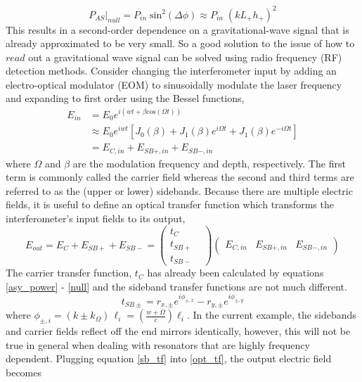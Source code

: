 			\begin{equation}\label{null}
			P_{AS} \vert_{null} = P_{in} \; \text{sin}^2 (\Delta \phi) \approx P_{in} \; (k L_{+} h_{+})^2 
			\end{equation}
		This results in a second-order dependence on a gravitational-wave signal that is already approximated to be very small.  
		So a good solution to the issue of how to $read$ out a gravitational wave signal can be solved using radio frequency (RF) detection methods. Consider changing the interferometer input by adding an electro-optical modulator (EOM) to sinusoidally modulate the laser frequency and expanding to first order using the Bessel functions,
			\begin{equation}\label{modE}
			\begin{aligned}
			E_{in} 	&= E_{0} e^{i(wt + \beta \text{cos} (\Omega t))} \\
					&\approx E_0 e^{iwt} [J_0(\beta) + J_1(\beta) e^{i \Omega t} + J_1(\beta) e^{-i \Omega t}] \\
					&= E_{C,in} + E_{SB+,in} + E_{SB-,in}
			\end{aligned}
			\end{equation}
		where $\Omega$ and $\beta$ are the modulation frequency and depth, respectively. The first term is commonly called the carrier field whereas the second and third terms are referred to as the (upper or lower) sidebands.  Because there are multiple electric fields, it is useful to define an optical transfer function which transforms the interferometer's input fields to its output,
		\begin{equation}\label{opt_tf}
		E_{out} = E_{C} + E_{SB+} + E_{SB-} = 
		\begin{pmatrix}
			t_{C} 	&   
		\\ 	t_{SB+} &
		\\ 	t_{SB-} &
		\end{pmatrix}
		\begin{pmatrix}
		E_{C,in} &    E_{SB+,in}    &  E_{SB-,in}     
		\end{pmatrix}
		\end{equation}
		The carrier transfer function, $t_{C}$ has already been calculated by equations \ref{asy_power} - \ref{null} and the sideband transfer functions are not much different.
		\begin{equation}\label{sb_tf}
		t_{SB\pm} = r_{x,\pm}  e^{i\phi_{\pm,x}} - r_{y,\pm}  e^{i\phi_{\pm,y}}
		\end{equation}
		where $\phi_{\pm,i} = (k \pm k_{\Omega}) \, \ell_{i} = (\frac{w+\Omega}{c} ) \ell_{i}$. In the current example, the sidebands and carrier fields reflect off the end mirrors identically, however, this will not be true in general when dealing with resonators that are highly frequency dependent.  Plugging equation \ref{sb_tf} into \ref{opt_tf}, the output electric field becomes 
